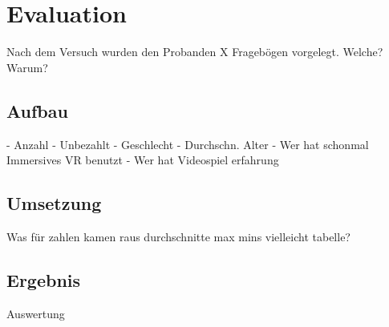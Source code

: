 \chapter{Evaluation}
Nach dem Versuch wurden den Probanden X Fragebögen vorgelegt.
Welche? Warum?

\section{Aufbau}
- Anzahl
- Unbezahlt
- Geschlecht
- Durchschn. Alter
- Wer hat schonmal Immersives VR benutzt
- Wer hat Videospiel erfahrung



\section{Umsetzung}
Was für zahlen kamen raus
durchschnitte max mins
vielleicht tabelle?

\section{Ergebnis}
Auswertung

